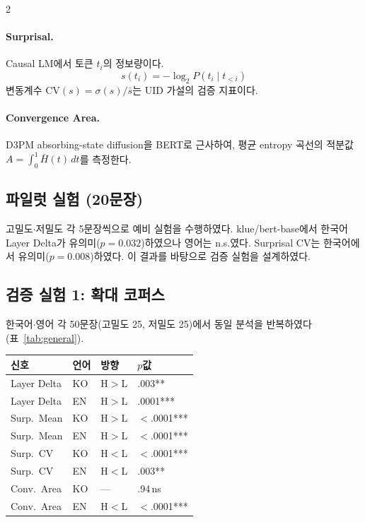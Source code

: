 \documentclass[10pt,a4paper]{article}
\begin{document}
\begin{multicols}{2}
\paragraph{Surprisal.}
Causal LM에서 토큰 $t_i$의 정보량이다.
\begin{equation}
s(t_i) = -\log_2 P(t_i \mid t_{<i})
\end{equation}
변동계수 $\mathrm{CV}(s) = \sigma(s)/\bar{s}$는 UID 가설\cite{levy2007}의 검증 지표이다.

\paragraph{Convergence Area.}
D3PM\cite{austin2021} absorbing-state diffusion을 BERT로 근사하여, 평균 entropy 곡선의 적분값 $A = \int_0^1 \bar{H}(t)\,dt$를 측정한다.

\subsection{파일럿 실험 (20문장)}

고밀도$\cdot$저밀도 각 5문장씩으로 예비 실험을 수행하였다. klue/bert-base에서 한국어 Layer Delta가 유의미($p{=}0.032$)하였으나 영어는 n.s.였다. Surprisal CV는 한국어에서 유의미($p{=}0.008$)하였다. 이 결과를 바탕으로 검증 실험을 설계하였다.

\subsection{검증 실험 1: 확대 코퍼스}

한국어$\cdot$영어 각 50문장(고밀도 25, 저밀도 25)에서 동일 분석을 반복하였다(표~\ref{tab:general}).

\vspace{4pt}
\begin{center}
\label{tab:general}
\footnotesize
\begin{tabular}{@{}llll@{}}
\toprule
신호 & 언어 & 방향 & $p$값 \\
\midrule
Layer Delta    & KO & H${>}$L & .003** \\
Layer Delta    & EN & H${>}$L & .0001*** \\
Surp.\ Mean   & KO & H${>}$L & ${<}$.0001*** \\
Surp.\ Mean   & EN & H${>}$L & ${<}$.0001*** \\
Surp.\ CV     & KO & H${<}$L & ${<}$.0001*** \\
Surp.\ CV     & EN & H${<}$L & .003** \\
Conv.\ Area   & KO & ---     & .94\,ns \\
Conv.\ Area   & EN & H${<}$L & ${<}$.0001*** \\
\bottomrule
\end{tabular}
\end{center}
\vspace{4pt}


\end{multicols}
\end{document}
